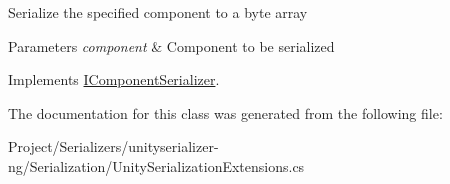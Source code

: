 Serialize the specified component to a byte array 


\begin{DoxyParams}{Parameters}
{\em component} & Component to be serialized \\
\hline
\end{DoxyParams}


Implements \hyperlink{interface_i_component_serializer_ab2aa38005665496b62d6c54b5f0dbd31}{I\+Component\+Serializer}.



The documentation for this class was generated from the following file\+:\begin{DoxyCompactItemize}
\item 
Project/\+Serializers/unityserializer-\/ng/\+Serialization/Unity\+Serialization\+Extensions.\+cs\end{DoxyCompactItemize}
